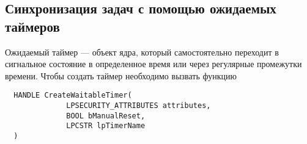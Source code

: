 \subsection{Синхронизация задач с помощью ожидаемых таймеров}
Ожидаемый таймер --- объект ядра, который самостоятельно переходит в сигнальное
состояние в определенное время или через регулярные промежутки времени. Чтобы
создать таймер необходимо вызвать функцию 
\begin{verbatim}
  HANDLE CreateWaitableTimer(
              LPSECURITY_ATTRIBUTES attributes,
              BOOL bManualReset,
              LPCSTR lpTimerName 
  )
\end{verbatim}
